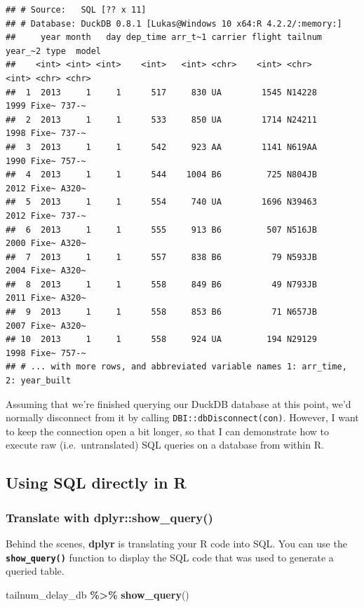 \documentclass[
]{article}
\newenvironment{Shaded}{\begin{snugshade}}{\end{snugshade}}
\newcommand{\FunctionTok}[1]{\textcolor[rgb]{0.13,0.29,0.53}{\textbf{#1}}}
\newcommand{\NormalTok}[1]{#1}
\newcommand{\SpecialCharTok}[1]{\textcolor[rgb]{0.81,0.36,0.00}{\textbf{#1}}}
\begin{document}
\begin{verbatim}
## # Source:   SQL [?? x 11]
## # Database: DuckDB 0.8.1 [Lukas@Windows 10 x64:R 4.2.2/:memory:]
##     year month   day dep_time arr_t~1 carrier flight tailnum year_~2 type  model
##    <int> <int> <int>    <int>   <int> <chr>    <int> <chr>     <int> <chr> <chr>
##  1  2013     1     1      517     830 UA        1545 N14228     1999 Fixe~ 737-~
##  2  2013     1     1      533     850 UA        1714 N24211     1998 Fixe~ 737-~
##  3  2013     1     1      542     923 AA        1141 N619AA     1990 Fixe~ 757-~
##  4  2013     1     1      544    1004 B6         725 N804JB     2012 Fixe~ A320~
##  5  2013     1     1      554     740 UA        1696 N39463     2012 Fixe~ 737-~
##  6  2013     1     1      555     913 B6         507 N516JB     2000 Fixe~ A320~
##  7  2013     1     1      557     838 B6          79 N593JB     2004 Fixe~ A320~
##  8  2013     1     1      558     849 B6          49 N793JB     2011 Fixe~ A320~
##  9  2013     1     1      558     853 B6          71 N657JB     2007 Fixe~ A320~
## 10  2013     1     1      558     924 UA         194 N29129     1998 Fixe~ 757-~
## # ... with more rows, and abbreviated variable names 1: arr_time, 2: year_built
\end{verbatim}

Assuming that we're finished querying our DuckDB database at this point,
we'd normally disconnect from it by calling
\texttt{DBI::dbDisconnect(con)}. However, I want to keep the connection
open a bit longer, so that I can demonstrate how to execute raw
(i.e.~untranslated) SQL queries on a database from within R.

\hypertarget{using-sql-directly-in-r}{%
\subsection{Using SQL directly in R}\label{using-sql-directly-in-r}}

\hypertarget{translate-with-dplyrshow_query}{%
\subsubsection{Translate with
dplyr::show\_query()}\label{translate-with-dplyrshow_query}}

Behind the scenes, \textbf{dplyr} is translating your R code into SQL.
You can use the \textbf{\texttt{show\_query()}} function to display the
SQL code that was used to generate a queried table.

\begin{Shaded}
\begin{Highlighting}[]
\NormalTok{tailnum\_delay\_db }\SpecialCharTok{\%\textgreater{}\%} \FunctionTok{show\_query}\NormalTok{()}
\end{Highlighting}
\end{Shaded}
\end{document}
